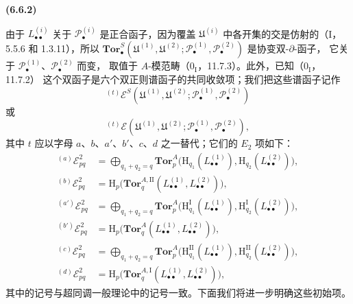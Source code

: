 \documentclass[UTF8,fontset=none,11pt,oneside,openany]{ctexbook}
\newenvironment{env}[1][]{%
  \par\medskip\noindent\textbf{(#1)}\ %
}{\par}
\newcommand{\oldpage}[2][]{%
  \hypertarget{ega-source-page-#1-#2}{}%
  \marginnote{\scriptsize\textbf{#1}~|~#2}\ignorespaces}
\begin{document}
\begin{env}[6.6.2]
由于 $L_{\bullet\bullet}^{(i)}$ 关于 $\mathscr P_\bullet^{(i)}$ 是正合函子，因为覆盖
\oldpage[III]{154}
$\mathfrak U^{(i)}$ 中各开集的交是仿射的（I，5.5.6 和 1.3.11），所以
$\mathbf{Tor}_\bullet^S
(\mathfrak U^{(1)},\mathfrak U^{(2)};
 \mathscr P_\bullet^{(1)},\mathscr P_\bullet^{(2)})$ 是协变双-$\partial$-函子，
它关于 $\mathscr P_\bullet^{(1)}$、$\mathscr P_\bullet^{(2)}$ 而变，
取值于 $A$-模范畴（$0_{\mathrm I}$，11.7.3）。此外，已知（$0_{\mathrm I}$，11.7.2）
这个双函子是六个双正则谱函子的共同收敛项；我们把这些谱函子记作
\[
  {}^{(t)}\mathscr E^S
  (\mathfrak U^{(1)},\mathfrak U^{(2)};
   \mathscr P_\bullet^{(1)},\mathscr P_\bullet^{(2)})
\]
或
\[
  {}^{(t)}\mathscr E
  (\mathfrak U^{(1)},\mathfrak U^{(2)};
   \mathscr P_\bullet^{(1)},\mathscr P_\bullet^{(2)}),
\]
其中 $t$ 应以字母 $a$、$b$、$a'$、$b'$、$c$、$d$ 之一替代；它们的 $E_2$ 项如下：
\[
\begin{aligned}
  {}^{(a)}\mathscr E_{pq}^2
  &=\bigoplus_{q_1+q_2=q}
    \mathbf{Tor}_p^A
    \bigl(\mathrm H_{q_1}(L_{\bullet\bullet}^{(1)}),
          \mathrm H_{q_2}(L_{\bullet\bullet}^{(2)})\bigr),\\
  {}^{(b)}\mathscr E_{pq}^2
  &=\mathrm H_p\bigl(
    \mathbf{Tor}_q^{A,\mathrm{II}}
    (L_{\bullet\bullet}^{(1)},L_{\bullet\bullet}^{(2)})\bigr),\\
  {}^{(a')}\mathscr E_{pq}^2
  &=\bigoplus_{q_1+q_2=q}
    \mathbf{Tor}_p^A
    \bigl(\mathrm H_{q_1}^{\mathrm I}(L_{\bullet\bullet}^{(1)}),
          \mathrm H_{q_2}^{\mathrm I}(L_{\bullet\bullet}^{(2)})\bigr),\\
  {}^{(b')}\mathscr E_{pq}^2
  &=\mathrm H_p\bigl(
    \mathbf{Tor}_q^A
    (L_{\bullet\bullet}^{(1)},L_{\bullet\bullet}^{(2)})\bigr),\\
  {}^{(c)}\mathscr E_{pq}^2
  &=\bigoplus_{q_1+q_2=q}
    \mathbf{Tor}_p^A
    \bigl(\mathrm H_{q_1}^{\mathrm{II}}(L_{\bullet\bullet}^{(1)}),
          \mathrm H_{q_2}^{\mathrm{II}}(L_{\bullet\bullet}^{(2)})\bigr),\\
  {}^{(d)}\mathscr E_{pq}^2
  &=\mathrm H_p\bigl(
    \mathbf{Tor}_q^{A,\mathrm I}
    (L_{\bullet\bullet}^{(1)},L_{\bullet\bullet}^{(2)})\bigr),
\end{aligned}
\]
其中的记号与超同调一般理论中的记号一致。下面我们将进一步明确这些初始项。
\end{env}
\end{document}
